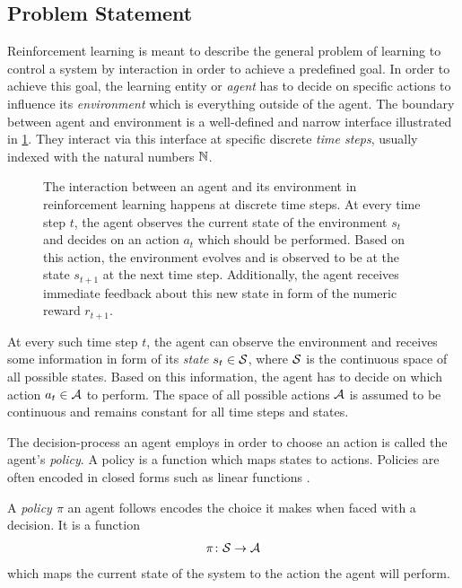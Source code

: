 \subsection{Problem Statement}
Reinforcement learning is meant to describe the general problem of learning to control a system by interaction in order to achieve a predefined goal.
In order to achieve this goal, the learning entity or \emph{agent} has to decide on specific actions to influence its \emph{environment} which is everything outside of the agent.
The boundary between agent and environment is a well-defined and narrow interface illustrated in \cref{fig:agent_environment_interaction}.
They interact via this interface at specific discrete \emph{time steps}, usually indexed with the natural numbers $\mathbb{N}$.
\begin{figure}[t]
    \centering
    
    \caption[Agent-environment interaction]{
        The interaction between an agent and its environment in reinforcement learning happens at discrete time steps.
        At every time step $t$, the agent observes the current state of the environment $s_t$ and decides on an action $a_t$ which should be performed.
        Based on this action, the environment evolves and is observed to be at the state $s_{t+1}$ at the next time step.
        Additionally, the agent receives immediate feedback about this new state in form of the numeric reward $r_{t+1}$.
    }
    \label{fig:agent_environment_interaction}
\end{figure}

At every such time step $t$, the agent can observe the environment and receives some information in form of its \emph{state} $s_t \in \mathcal{S}$, where $\mathcal{S}$ is the continuous space of all possible states.
Based on this information, the agent has to decide on which action $a_t \in \mathcal{A}$ to perform.
The space of all possible actions $\mathcal{A}$ is assumed to be continuous and remains constant for all time steps and states.

The decision-process an agent employs in order to choose an action is called the agent's \emph{policy}.
A policy is a function which maps states to actions.
Policies are often encoded in closed forms such as linear functions \cite{deisenroth_efficient_2010}.
\begin{definition}[Policy]
    A \emph{policy $\pi$} an agent follows encodes the choice it makes when faced with a decision.
    It is a function
    \begin{align}
        \pi \colon \Es \to \Ah
    \end{align}
    which maps the current state of the system to the action the agent will perform.
\end{definition}

